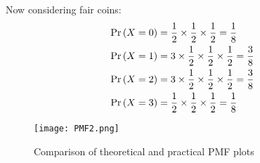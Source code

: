 \documentclass[journal,12pt,two column]{IEEEtran}
\begin{document}
Now considering fair coins:
\begin{align}
\Pr\left(X = 0\right) &= \frac{1}{2}\times\frac{1}{2}\times\frac{1}{2} = \frac{1}{8} \\
\Pr\left(X = 1\right) &= 3\times\frac{1}{2}\times\frac{1}{2}\times\frac{1}{2} = \frac{3}{8} \\
\Pr\left(X = 2\right) &= 3\times\frac{1}{2}\times\frac{1}{2}\times\frac{1}{2} = \frac{3}{8} \\
\Pr\left(X = 3\right) &= \frac{1}{2}\times\frac{1}{2}\times\frac{1}{2} = \frac{1}{8}
\end{align}
\begin{figure}[!ht]
     \centering
     \texttt{[image: PMF2.png]}
     \caption{Comparison of theoretical and practical PMF plots}
     \label{fig:Figure 2}
\end{figure}
\end{document}
